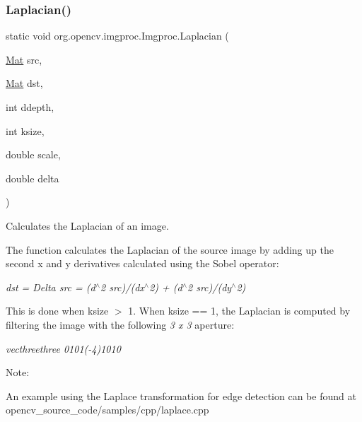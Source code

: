 \subsubsection{\texorpdfstring{Laplacian()}{Laplacian()}\hspace{0.1cm}{\footnotesize\ttfamily [2/3]}}
{\footnotesize\ttfamily static void org.\+opencv.\+imgproc.\+Imgproc.\+Laplacian (\begin{DoxyParamCaption}\item[{\mbox{\hyperlink{classorg_1_1opencv_1_1core_1_1_mat}{Mat}}}]{src,  }\item[{\mbox{\hyperlink{classorg_1_1opencv_1_1core_1_1_mat}{Mat}}}]{dst,  }\item[{int}]{ddepth,  }\item[{int}]{ksize,  }\item[{double}]{scale,  }\item[{double}]{delta }\end{DoxyParamCaption})\hspace{0.3cm}{\ttfamily [static]}}

Calculates the Laplacian of an image.

The function calculates the Laplacian of the source image by adding up the second x and y derivatives calculated using the Sobel operator\+:

{\itshape dst = Delta src = (d$^\wedge$2 src)/(dx$^\wedge$2) + (d$^\wedge$2 src)/(dy$^\wedge$2)}

This is done when {\ttfamily ksize $>$ 1}. When {\ttfamily ksize == 1}, the Laplacian is computed by filtering the image with the following {\itshape 3 x 3} aperture\+:

{\itshape vecthreethree 0101(-\/4)1010}

Note\+:


\begin{DoxyItemize}
\item An example using the Laplace transformation for edge detection can be found at opencv\+\_\+source\+\_\+code/samples/cpp/laplace.\+cpp 
\end{DoxyItemize}


